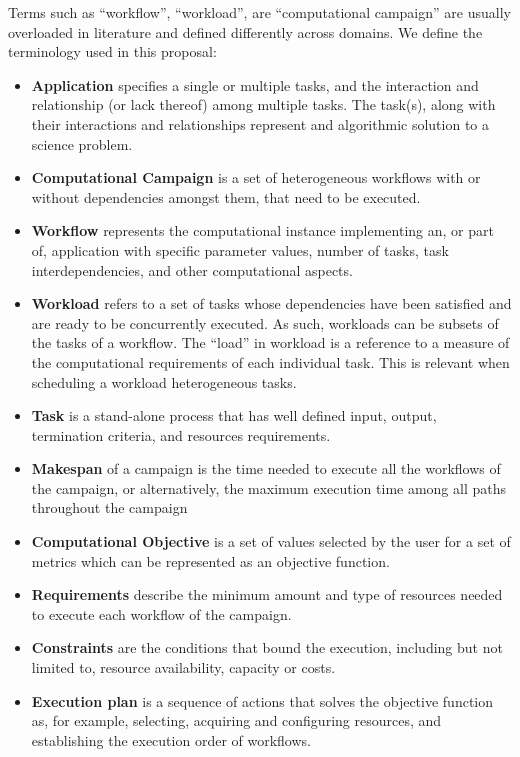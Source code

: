\label{definitions}
Terms such as ``workflow'', ``workload'', are ``computational campaign'' are usually overloaded in literature and defined differently across domains. We define the terminology used in this proposal:
\begin{itemize}
    \item \textbf{Application} specifies a single or multiple tasks, and the interaction and relationship (or lack thereof) among multiple tasks. The task(s), along with their interactions and relationships represent and algorithmic solution to a science problem.
    \item \textbf{Computational Campaign} is a set of heterogeneous workflows with or without dependencies amongst them, that need to be executed.
    \item \textbf{Workflow} represents the computational instance implementing an, or part of, application with specific parameter values, number of tasks, task interdependencies, and other computational aspects.
    \item \textbf{Workload} refers to a set of tasks whose dependencies have been satisfied and are ready to be concurrently executed. As such, workloads can be subsets of the tasks of a workflow. The “load” in workload is a reference to a measure of the computational requirements of each individual task. This is relevant when scheduling a workload heterogeneous tasks.
    \item \textbf{Task} is a stand-alone process that has well defined input, output, termination criteria, and resources requirements.
    \item \textbf{Makespan} of a campaign is the time needed to execute all the workflows of the campaign, or alternatively, the maximum execution time among all paths throughout the campaign~\cite{chirkin2017execution}
    \item \textbf{Computational Objective} is a set of values selected by the user for a set of metrics which can be represented as an objective function.
    \item \textbf{Requirements} describe the minimum amount and type of resources needed to execute each workflow of the campaign.
    \item \textbf{Constraints} are the conditions that bound the execution, including but not limited to, resource availability, capacity or costs.
    \item \textbf{Execution plan} is a sequence of actions that solves the objective function as, for example, selecting, acquiring and configuring resources, and establishing the execution order of workflows.
\end{itemize}
